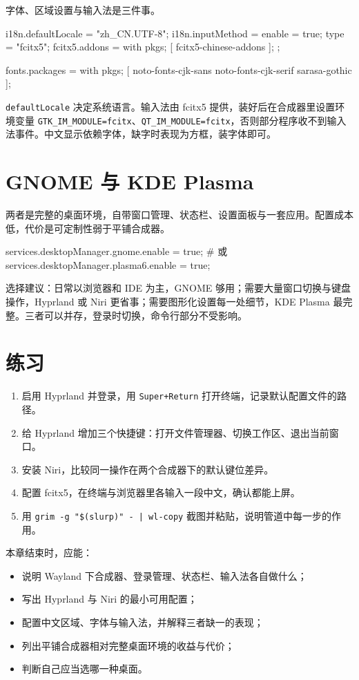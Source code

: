 字体、区域设置与输入法是三件事。

\begin{nixcode}
i18n.defaultLocale = "zh_CN.UTF-8";
i18n.inputMethod = {
  enable = true;
  type = "fcitx5";
  fcitx5.addons = with pkgs; [ fcitx5-chinese-addons ];
};

fonts.packages = with pkgs; [
  noto-fonts-cjk-sans
  noto-fonts-cjk-serif
  sarasa-gothic
];
\end{nixcode}

\texttt{defaultLocale} 决定系统语言。输入法由 fcitx5 提供，装好后在合成器里设置环境变量 \texttt{GTK\_IM\_MODULE=fcitx}、\texttt{QT\_IM\_MODULE=fcitx}，否则部分程序收不到输入法事件。中文显示依赖字体，缺字时表现为方框，装字体即可。

\section{GNOME 与 KDE Plasma}

两者是完整的桌面环境，自带窗口管理、状态栏、设置面板与一套应用。配置成本低，代价是可定制性弱于平铺合成器。

\begin{nixcode}
services.desktopManager.gnome.enable = true;
# 或
services.desktopManager.plasma6.enable = true;
\end{nixcode}

选择建议：日常以浏览器和 IDE 为主，GNOME 够用；需要大量窗口切换与键盘操作，Hyprland 或 Niri 更省事；需要图形化设置每一处细节，KDE Plasma 最完整。三者可以并存，登录时切换，命令行部分不受影响。

\section{练习}

\begin{enumerate}
  \item 启用 Hyprland 并登录，用 \texttt{Super+Return} 打开终端，记录默认配置文件的路径。
  \item 给 Hyprland 增加三个快捷键：打开文件管理器、切换工作区、退出当前窗口。
  \item 安装 Niri，比较同一操作在两个合成器下的默认键位差异。
  \item 配置 fcitx5，在终端与浏览器里各输入一段中文，确认都能上屏。
  \item 用 \texttt{grim -g "\$(slurp)" - | wl-copy} 截图并粘贴，说明管道中每一步的作用。
\end{enumerate}

\begin{checkpoint}
本章结束时，应能：
\begin{itemize}
  \item 说明 Wayland 下合成器、登录管理、状态栏、输入法各自做什么；
  \item 写出 Hyprland 与 Niri 的最小可用配置；
  \item 配置中文区域、字体与输入法，并解释三者缺一的表现；
  \item 列出平铺合成器相对完整桌面环境的收益与代价；
  \item 判断自己应当选哪一种桌面。
\end{itemize}
\end{checkpoint}
